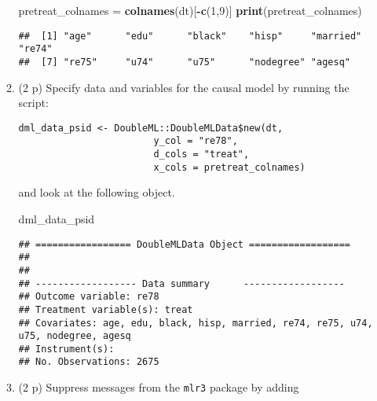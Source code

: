 \documentclass[
]{article}
\newenvironment{Shaded}{\begin{snugshade}}{\end{snugshade}}
\newcommand{\AttributeTok}[1]{\textcolor[rgb]{0.13,0.29,0.53}{#1}}
\newcommand{\DecValTok}[1]{\textcolor[rgb]{0.00,0.00,0.81}{#1}}
\newcommand{\FunctionTok}[1]{\textcolor[rgb]{0.13,0.29,0.53}{\textbf{#1}}}
\newcommand{\NormalTok}[1]{#1}
\newcommand{\OtherTok}[1]{\textcolor[rgb]{0.56,0.35,0.01}{#1}}
\newcommand{\SpecialCharTok}[1]{\textcolor[rgb]{0.81,0.36,0.00}{\textbf{#1}}}
\newcommand{\StringTok}[1]{\textcolor[rgb]{0.31,0.60,0.02}{#1}}
\begin{document}
\begin{enumerate}
\begin{enumerate}
\begin{Shaded}
\begin{Highlighting}[]
\NormalTok{pretreat\_colnames }\OtherTok{=} \FunctionTok{colnames}\NormalTok{(dt)[}\SpecialCharTok{{-}}\FunctionTok{c}\NormalTok{(}\DecValTok{1}\NormalTok{,}\DecValTok{9}\NormalTok{)] }
\FunctionTok{print}\NormalTok{(pretreat\_colnames)}
\end{Highlighting}
\end{Shaded}

\begin{verbatim}
##  [1] "age"      "edu"      "black"    "hisp"     "married"  "re74"    
##  [7] "re75"     "u74"      "u75"      "nodegree" "agesq"
\end{verbatim}
  \item
    (2 p) Specify data and variables for the causal model by running the
    script:\label{item:dml-data}

\begin{verbatim}
dml_data_psid <- DoubleML::DoubleMLData$new(dt,
                        y_col = "re78",
                        d_cols = "treat",
                        x_cols = pretreat_colnames)
\end{verbatim}

    and look at the following object.

\begin{Shaded}
\end{Shaded}

\begin{Shaded}
\begin{Highlighting}[]
\NormalTok{dml\_data\_psid}
\end{Highlighting}
\end{Shaded}

\begin{verbatim}
## ================= DoubleMLData Object ==================
## 
## 
## ------------------ Data summary      ------------------
## Outcome variable: re78
## Treatment variable(s): treat
## Covariates: age, edu, black, hisp, married, re74, re75, u74, u75, nodegree, agesq
## Instrument(s): 
## No. Observations: 2675
\end{verbatim}
  \item
    (2 p) Suppress messages from the \texttt{mlr3} package by adding


\end{enumerate}
\end{enumerate}
\end{document}
